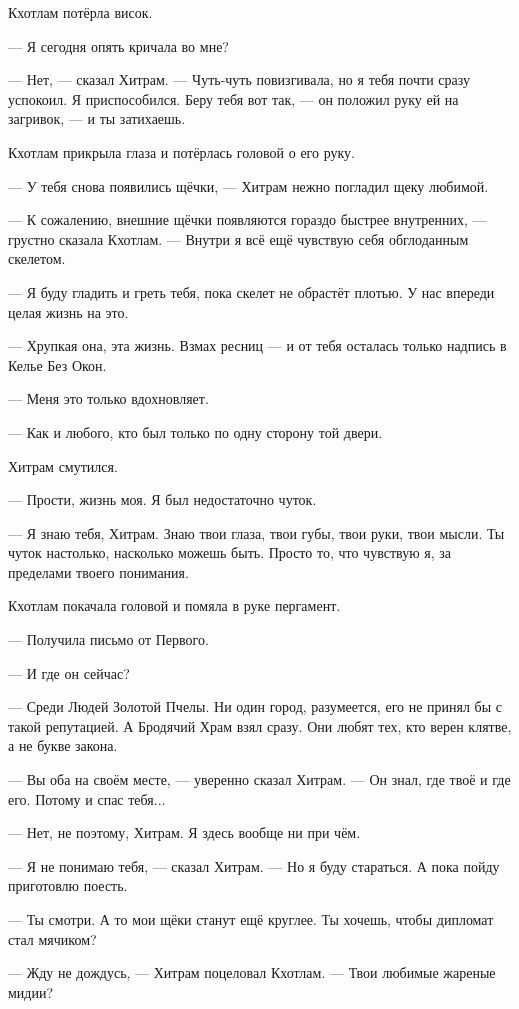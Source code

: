 Кхотлам потёрла висок.

--- Я сегодня опять кричала во мне?

--- Нет, --- сказал Хитрам.
--- Чуть-чуть повизгивала, но я тебя почти сразу успокоил.
Я приспособился.
Беру тебя вот так, --- он положил руку ей на загривок, --- и ты затихаешь.

Кхотлам прикрыла глаза и потёрлась головой о его руку.

--- У тебя снова появились щёчки, --- Хитрам нежно погладил щеку любимой.

--- К сожалению, внешние щёчки появляются гораздо быстрее внутренних, --- грустно сказала Кхотлам.
--- Внутри я всё ещё чувствую себя обглоданным скелетом.

--- Я буду гладить и греть тебя, пока скелет не обрастёт плотью.
У нас впереди целая жизнь на это.

--- Хрупкая она, эта жизнь.
Взмах ресниц --- и от тебя осталась только надпись в Келье Без Окон.

--- Меня это только вдохновляет.

--- Как и любого, кто был только по одну сторону той двери.

Хитрам смутился.

--- Прости, жизнь моя.
Я был недостаточно чуток.

--- Я знаю тебя, Хитрам.
Знаю твои глаза, твои губы, твои руки, твои мысли.
Ты чуток настолько, насколько можешь быть.
Просто то, что чувствую я, за пределами твоего понимания.

Кхотлам покачала головой и помяла в руке пергамент.

--- Получила письмо от Первого.

--- И где он сейчас?

--- Среди Людей Золотой Пчелы.
Ни один город, разумеется, его не принял бы с такой репутацией.
А Бродячий Храм взял сразу.
Они любят тех, кто верен клятве, а не букве закона.

--- Вы оба на своём месте, --- уверенно сказал Хитрам.
--- Он знал, где твоё и где его.
Потому и спас тебя...

--- Нет, не поэтому, Хитрам.
Я здесь вообще ни при чём.

--- Я не понимаю тебя, --- сказал Хитрам.
--- Но я буду стараться.
А пока пойду приготовлю поесть.

--- Ты смотри.
А то мои щёки станут ещё круглее.
Ты хочешь, чтобы дипломат стал мячиком?

--- Жду не дождусь, --- Хитрам поцеловал Кхотлам.
--- Твои любимые жареные мидии?

